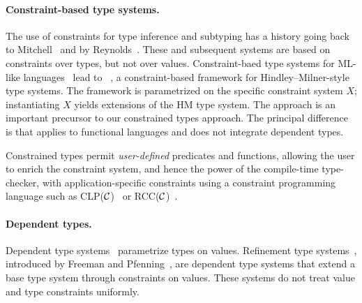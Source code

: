 

\paragraph{Constraint-based type systems.}

The use of constraints for type inference and subtyping has a history
going back to Mitchell~\cite{mitchell84} and by
Reynolds~\cite{reynolds85}.  These and subsequent systems
are based on
constraints over types, but not over values.
Constraint-baed type systems for ML-like
languages~\cite{trifonov96,pottier96simplifying}
lead to \hmx~\cite{sulzmann97type}, a constraint-based framework for
Hindley--Milner-style type systems.
The framework is parametrized on
the specific constraint system $X$; instantiating $X$ yields
extensions of the HM type system.  
The \hmx{} approach is an important precursor to
our constrained types approach. The principal difference is that
\hmx{} applies to functional languages and does not integrate
dependent types.

Constrained types permit {\em user-defined}
predicates and functions, allowing the user to enrich
the constraint system, and hence the power of the compile-time type-checker,
with application-specific constraints using a constraint
programming language such as CLP($\cal C$)~\cite{clp} or 
RCC($\cal C$)~\cite{DBLP:conf/fsttcs/JagadeesanNS05}.

\paragraph{Dependent types.}

Dependent type
systems~\cite{xi99dependent,calc-constructions,epigram,cayenne}
param\-etrize types on values.  Refinement type
systems~\cite{refinement-types,conditional-types,jones94,sized-types,flanagan-popl06,flanagan-fool06,liquid-types},
introduced by Freeman and Pfenning~\cite{refinement-types}, are dependent type
systems that extend a base type system through constraints on values.  These
systems do not treat value and type constraints uniformly.

